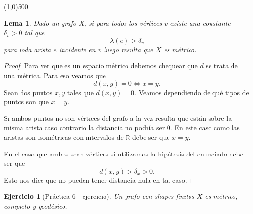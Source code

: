 \documentclass[11pt]{article}
\theoremstyle{plain}
\newtheorem{lema}[teo]{Lema}
\newtheorem*{ej}{Ejercicio}
\theoremstyle{definition}
\theoremstyle{remark}
\newcommand\RR{\mathbb{R}}
\begin{document}
\line(1,0){500}

\bigskip


\begin{lema}\label{grafo-metrico}
	Dado un grafo $X$, si para todos los vértices $v$ existe una constante $\delta_v > 0$ tal que
	\[
	\lambda(e) > \delta_v
	\]
	para toda arista $e$ incidente en $v$ luego resulta que $X$ es métrico. 
\end{lema}

\begin{proof}
	Para ver que es un espacio métrico debemos chequear que $d$ se trata de una métrica. Para eso veamos que
	\[
	d(x,y)=0 \iff x=y.
	\]
	Sean dos puntos $x,y$ tales que $d(x,y)=0$. Veamos dependiendo de qué tipos de puntos son que $x=y.$
	
	Si ambos puntos no son vértices del grafo a la vez resulta que están sobre la misma arista caso contrario la distancia no podría ser 0. En este caso como las aristas son isométricas con intervalos de $\RR$ debe ser que $x=y.$
	
	En el caso que ambos sean vértices si utilizamos la hipótesis del enunciado debe ser que
	\[
	d(x,y) > \delta_x > 0.
	\]
	Esto nos dice que no pueden tener distancia nula en tal caso.
\end{proof}

\begin{tcolorbox}[colback=teal!25!white,colframe=teal!75!black]
	\begin{ej}[Práctica 6 - ejercicio]
		Un grafo con shapes finitos $X$ es métrico, completo y geodésico.
	\end{ej}
\end{tcolorbox}
\end{document}
